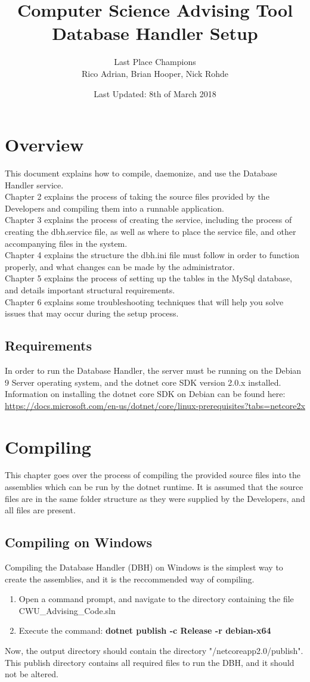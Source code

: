 \documentclass[letterpaper]{article}
\title{Computer Science Advising Tool \\ Database Handler Setup}
\author{Last Place Champions \\ Rico Adrian, Brian Hooper, Nick Rohde}
\date{Last Updated: 8th of March 2018}
\begin{document}
	\maketitle
	\tableofcontents
	\pagebreak
	
	\section{Overview}
	This document explains how to compile, daemonize, and use the Database Handler service. \\ Chapter 2 explains the process of taking the source files provided by the Developers and compiling them into a runnable application. \\ Chapter 3 explains the process of creating the service, including the process of creating the dbh.service file, as well as where to place the service file, and other accompanying files in the system.\\ Chapter 4 explains the structure the dbh.ini file must follow in order to function properly, and what changes can be made by the administrator. \\ Chapter 5 explains the process of setting up the tables in the MySql database, and details important structural requirements. \\ Chapter 6 explains some troubleshooting techniques that will help you solve issues that may occur during the setup process.
	
	\subsection{Requirements}
	In order to run the Database Handler, the server must be running on the Debian 9 Server operating system, and the dotnet core SDK version 2.0.x installed. Information on installing the dotnet core SDK on Debian can be found here: \url{https://docs.microsoft.com/en-us/dotnet/core/linux-prerequisites?tabs=netcore2x}
	 
	\section{Compiling}
	This chapter goes over the process of compiling the provided source files into the assemblies which can be run by the dotnet runtime. It is assumed that the source files are in the same folder structure as they were supplied by the Developers, and all files are present.
	\subsection{Compiling on Windows}
	Compiling the Database Handler (DBH) on Windows is the simplest way to create the assemblies, and it is the reccommended way of compiling. 
	\begin{enumerate}
		\item Open a command prompt, and navigate to the directory containing the file CWU\_Advising\_Code.sln
		\item Execute the command: \textbf{dotnet publish -c Release -r debian-x64 }
	\end{enumerate}
	Now, the output directory should contain the directory "/netcoreapp2.0/publish". This publish directory contains all required files to run the DBH, and it should not be altered.
\end{document}
